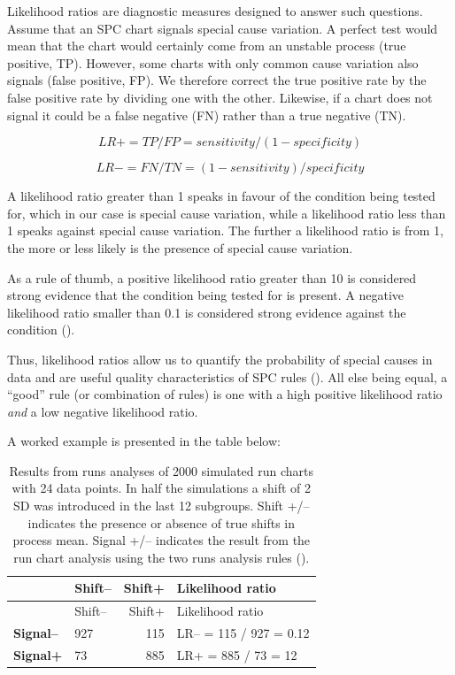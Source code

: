 \documentclass[
]{book}
\begin{document}
Likelihood ratios are diagnostic measures designed to answer such questions. Assume that an SPC chart signals special cause variation. A perfect test would mean that the chart would certainly come from an unstable process (true positive, TP). However, some charts with only common cause variation also signals (false positive, FP). We therefore correct the true positive rate by the false positive rate by dividing one with the other. Likewise, if a chart does not signal it could be a false negative (FN) rather than a true negative (TN).

\[ LR+=TP/FP=sensitivity/(1-specificity) \]

\[ LR-=FN/TN=(1-sensitivity)/specificity \]

A likelihood ratio greater than 1 speaks in favour of the condition being tested for, which in our case is special cause variation, while a likelihood ratio less than 1 speaks against special cause variation. The further a likelihood ratio is from 1, the more or less likely is the presence of special cause variation.

As a rule of thumb, a positive likelihood ratio greater than 10 is considered strong evidence that the condition being tested for is present. A negative likelihood ratio smaller than 0.1 is considered strong evidence against the condition ().

Thus, likelihood ratios allow us to quantify the probability of special causes in data and are useful quality characteristics of SPC rules (). All else being equal, a ``good'' rule (or combination of rules) is one with a high positive likelihood ratio \emph{and} a low negative likelihood ratio.

A worked example is presented in the table below:

\begin{longtable}[]{@{}llrl@{}}
\caption{Results from runs analyses of 2000 simulated run charts with 24 data points. In half the simulations a shift of 2 SD was introduced in the last 12 subgroups. Shift +/-- indicates the presence or absence of true shifts in process mean. Signal +/-- indicates the result from the run chart analysis using the two runs analysis rules ().}\tabularnewline
\toprule\noalign{}
& Shift-- & Shift+ & Likelihood ratio \\
\midrule\noalign{}
\endfirsthead
\toprule\noalign{}
& Shift-- & Shift+ & Likelihood ratio \\
\midrule\noalign{}
\endhead
\bottomrule\noalign{}
\endlastfoot
\textbf{Signal--} & 927 & 115 & LR-- = 115 / 927 = 0.12 \\
\textbf{Signal+} & 73 & 885 & LR+ = 885 / 73 = 12 \\
\end{longtable}
\end{document}
